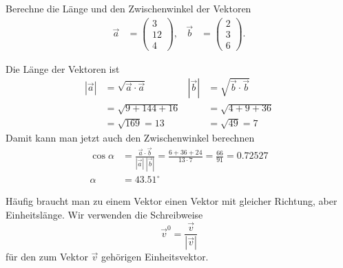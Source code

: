 \begin{beispiel}
Berechne die Länge und den Zwischenwinkel der Vektoren
\begin{align*}
\vec a&= \begin{pmatrix} 3\\12\\ 4 \end{pmatrix},
&
\vec b&= \begin{pmatrix}2\\3\\6\end{pmatrix}.
\end{align*}

\smallskip

{\parindent 0pt Die} Länge der Vektoren ist
\begin{align*}
|\vec a|
&
=\sqrt{\vec a\cdot \vec a}
&
|\vec b|
&
=\sqrt{\vec b\cdot \vec b}
\\
&=\sqrt{9+144+16}
&
&=\sqrt{4+9+36}
\\
&=\sqrt{169}=13
&
&
=\sqrt{49}=7
\end{align*}
Damit kann man jetzt auch den Zwischenwinkel berechnen
\begin{align*}
\cos\alpha&= \frac{\vec a\cdot \vec b}{|\vec a|\;|\vec b|}
=
\frac{6+36+24}{13\cdot 7}=\frac{66}{91}=0.72527
\\
\alpha&=43.51^\circ
\end{align*}
\end{beispiel}
Häufig braucht man zu einem Vektor einen Vektor mit gleicher Richtung,
aber Einheitslänge.
Wir verwenden die Schreibweise
\[
\vec{v}^0 = \frac{\vec{v}}{|\vec{v}|}
\]
für den zum Vektor $\vec{v}$ gehörigen Einheitsvektor.

